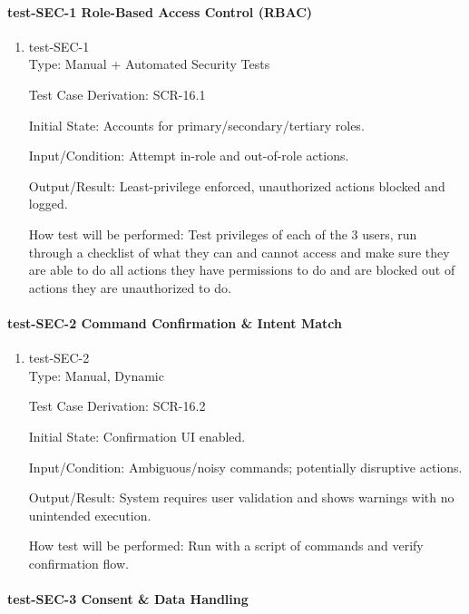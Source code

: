 \documentclass[12pt, titlepage]{article}
\begin{document}
\paragraph{test-SEC-1 Role-Based Access Control (RBAC)}

\begin{enumerate}
\item{test-SEC-1\\}
Type: Manual + Automated Security Tests

Test Case Derivation: SCR-16.1

Initial State: Accounts for primary/secondary/tertiary roles.

Input/Condition: Attempt in-role and out-of-role actions.

Output/Result: Least-privilege enforced, unauthorized actions blocked and logged.

How test will be performed: Test privileges of each of the 3 users, run through a checklist of what they can and cannot access and make sure they are able to do all actions they have permissions to do and are blocked out of actions they are unauthorized to do.
\end{enumerate}

\paragraph{test-SEC-2 Command Confirmation \& Intent Match}

\begin{enumerate}
\item{test-SEC-2\\}
Type: Manual, Dynamic

Test Case Derivation: SCR-16.2

Initial State: Confirmation UI enabled.

Input/Condition: Ambiguous/noisy commands; potentially disruptive actions.

Output/Result: System requires user validation and shows warnings with no unintended execution.

How test will be performed: Run with a script of commands and verify confirmation flow.
\end{enumerate}

\paragraph{test-SEC-3 Consent \& Data Handling}
\end{document}
